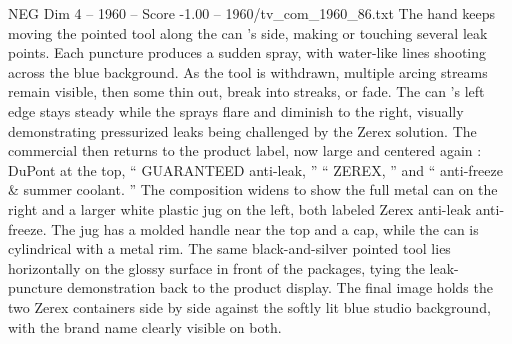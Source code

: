 \begin{textsample}{NEG Dim 4 – 1960 – Score -1.00 – 1960/tv\_com\_1960\_86.txt}
The hand keeps moving the pointed tool along the can ’s side, making or touching several leak points.
Each puncture produces a sudden spray, with water-like lines shooting across the blue background.
As the tool is withdrawn, multiple arcing streams remain visible, then some thin out, break into streaks, or fade.
The can ’s left edge stays steady while the sprays flare and diminish to the right, visually demonstrating pressurized leaks being challenged by the Zerex solution.
The commercial then returns to the product label, now large and centered again : DuPont at the top, “ GUARANTEED anti-leak, ” “ ZEREX, ” and “ anti-freeze \& summer coolant. ” The composition widens to show the full metal can on the right and a larger white plastic jug on the left, both labeled Zerex anti-leak anti-freeze.
The jug has a molded handle near the top and a cap, while the can is cylindrical with a metal rim.
The same black-and-silver pointed tool lies horizontally on the glossy surface in front of the packages, tying the leak-puncture demonstration back to the product display.
The final image holds the two Zerex containers side by side against the softly lit blue studio background, with the brand name clearly visible on both.

\end{textsample}
